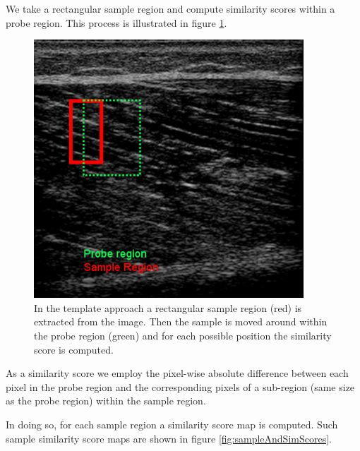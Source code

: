 \documentclass[10pt,twocolumn,letterpaper]{article}
\begin{document}
We take a rectangular sample region and compute similarity scores within a probe region. This process is illustrated in figure \ref{fig:templateApproach}. 

\begin{figure}
	\begin{center}		
		\includegraphics[width=1\linewidth]{img/templateApproach}
	\end{center}
	\caption{In the template approach a rectangular sample region (red) is extracted from the image. Then the sample is moved around within the probe region (green) and for each possible position the similarity score is computed.}
	\label{fig:templateApproach}
	
\end{figure}

As a similarity score we employ the pixel-wise absolute difference between each pixel in the probe region and the corresponding pixels of a sub-region (same size as the probe region) within the sample region.

In doing so, for each sample region a similarity score map is computed. Such sample similarity score maps are shown in figure \ref{fig:sampleAndSimScores}.  
\end{document}
